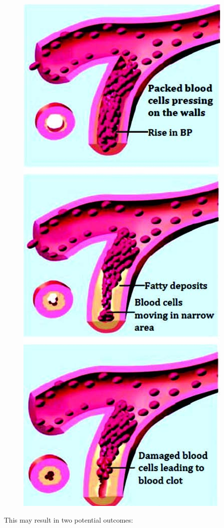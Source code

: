 \begin{figure}
\includegraphics{images/042.jpg}
\end{figure}

This may result in two potential outcomes:

